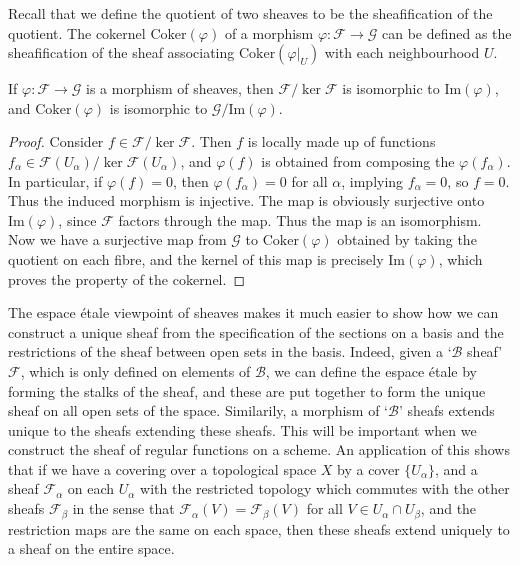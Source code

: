 Recall that we define the quotient of two sheaves to be the sheafification of the quotient. The cokernel $\text{Coker}(\varphi)$ of a morphism $\varphi: \mathcal{F} \to \mathcal{G}$ can be defined as the sheafification of the sheaf associating $\text{Coker}(\varphi|_U)$ with each neighbourhood $U$.

\begin{theorem}
    If $\varphi: \mathcal{F} \to \mathcal{G}$ is a morphism of sheaves, then $\mathcal{F} / \ker \mathcal{F}$ is isomorphic to $\text{Im}(\varphi)$, and $\text{Coker}(\varphi)$ is isomorphic to $\mathcal{G} / \text{Im}(\varphi)$.
\end{theorem}
\begin{proof}
    Consider $f \in \mathcal{F} / \ker \mathcal{F}$. Then $f$ is locally made up of functions $f_\alpha \in \mathcal{F}(U_\alpha) / \ker \mathcal{F}(U_\alpha)$, and $\varphi(f)$ is obtained from composing the $\varphi(f_\alpha)$. In particular, if $\varphi(f) = 0$, then $\varphi(f_\alpha) = 0$ for all $\alpha$, implying $f_\alpha = 0$, so $f = 0$. Thus the induced morphism is injective. The map is obviously surjective onto $\text{Im}(\varphi)$, since $\mathcal{F}$ factors through the map. Thus the map is an isomorphism. Now we have a surjective map from $\mathcal{G}$ to $\text{Coker}(\varphi)$ obtained by taking the quotient on each fibre, and the kernel of this map is precisely $\text{Im}(\varphi)$, which proves the property of the cokernel.
\end{proof}

The espace \'{e}tale viewpoint of sheaves makes it much easier to show how we can construct a unique sheaf from the specification of the sections on a basis and the restrictions of the sheaf between open sets in the basis. Indeed, given a `$\mathcal{B}$ sheaf' $\mathcal{F}$, which is only defined on elements of $\mathcal{B}$, we can define the espace \'{e}tale by forming the stalks of the sheaf, and these are put together to form the unique sheaf on all open sets of the space. Similarily, a morphism of `$\mathcal{B}$' sheafs extends unique to the sheafs extending these sheafs. This will be important when we construct the sheaf of regular functions on a scheme. An application of this shows that if we have a covering over a topological space $X$ by a cover $\{ U_\alpha \}$, and a sheaf $\mathcal{F}_\alpha$ on each $U_\alpha$ with the restricted topology which commutes with the other sheafs $\mathcal{F}_\beta$ in the sense that $\mathcal{F}_\alpha(V) = \mathcal{F}_\beta(V)$ for all $V \in U_\alpha \cap U_\beta$, and the restriction maps are the same on each space, then these sheafs extend uniquely to a sheaf on the entire space.

